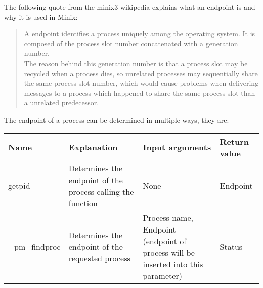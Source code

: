 The following quote from the minix3 wikipedia explains what an endpoint
is and why it is used in Minix:

\begin{quote}
A endpoint identifies a process uniquely among the operating system. It
is composed of the process slot number concatenated with a generation
number.\\
The reason behind this generation number is that a process slot may be
recycled when a process dies, so unrelated processes may sequentially
share the same process slot number, which would cause problems when
delivering messages to a process which happened to share the same
process slot than a unrelated predecessor.
\end{quote}

The endpoint of a process can be determined in multiple ways, they are:

\begin{longtable}[]{@{}llll@{}}
\toprule
\begin{minipage}[b]{0.11\columnwidth}\raggedright
Name\strut
\end{minipage} & \begin{minipage}[b]{0.23\columnwidth}\raggedright
Explanation\strut
\end{minipage} & \begin{minipage}[b]{0.30\columnwidth}\raggedright
Input arguments\strut
\end{minipage} & \begin{minipage}[b]{0.25\columnwidth}\raggedright
Return value\strut
\end{minipage}\tabularnewline
\midrule
\endhead
\begin{minipage}[t]{0.11\columnwidth}\raggedright
getpid\strut
\end{minipage} & \begin{minipage}[t]{0.23\columnwidth}\raggedright
Determines the endpoint of the process calling the function\strut
\end{minipage} & \begin{minipage}[t]{0.30\columnwidth}\raggedright
None\strut
\end{minipage} & \begin{minipage}[t]{0.25\columnwidth}\raggedright
Endpoint\strut
\end{minipage}\tabularnewline
\begin{minipage}[t]{0.11\columnwidth}\raggedright
\_pm\_findproc\strut
\end{minipage} & \begin{minipage}[t]{0.23\columnwidth}\raggedright
Determines the endpoint of the requested process\strut
\end{minipage} & \begin{minipage}[t]{0.30\columnwidth}\raggedright
Process name, Endpoint (endpoint of process will be inserted into this
parameter)\strut
\end{minipage} & \begin{minipage}[t]{0.25\columnwidth}\raggedright
Status\strut
\end{minipage}\tabularnewline
\bottomrule
\end{longtable}

